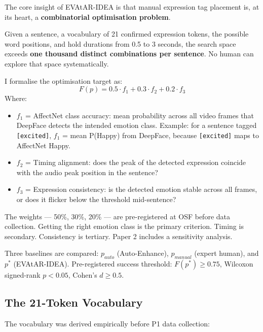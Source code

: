 \documentclass[12pt,a4paper]{article}
\begin{document}
\begin{speechbox}
The core insight of EVAtAR-IDEA is that manual expression tag placement is, at its heart,
a \textbf{combinatorial optimisation problem}.

Given a sentence, a vocabulary of 21 confirmed expression tokens, the possible word positions,
and hold durations from 0.5 to 3 seconds, the search space exceeds \textbf{one thousand distinct
combinations per sentence}. No human can explore that space systematically.

I formalise the optimisation target as:
\[
F(p) = 0.5 \cdot f_1 + 0.3 \cdot f_2 + 0.2 \cdot f_3
\]
Where:
\begin{itemize}[leftmargin=2em,itemsep=2pt]
  \item $f_1$ = AffectNet class accuracy: mean probability across all video frames that DeepFace
    detects the intended emotion class. Example: for a sentence tagged \texttt{[excited]},
    $f_1$ = mean P(Happy) from DeepFace, because \texttt{[excited]} maps to AffectNet Happy.
  \item $f_2$ = Timing alignment: does the peak of the detected expression coincide with the
    audio peak position in the sentence?
  \item $f_3$ = Expression consistency: is the detected emotion stable across all frames,
    or does it flicker below the threshold mid-sentence?
\end{itemize}

The weights --- 50\%, 30\%, 20\% --- are pre-registered at OSF before data collection.
Getting the right emotion class is the primary criterion. Timing is secondary.
Consistency is tertiary. Paper 2 includes a sensitivity analysis.

Three baselines are compared: \textbf{$p_{auto}$} (Auto-Enhance), \textbf{$p_{manual}$}
(expert human), and \textbf{$p^*$} (EVAtAR-IDEA). Pre-registered success threshold:
$F(p^*) \geq 0.75$, Wilcoxon signed-rank $p < 0.05$, Cohen's $d \geq 0.5$.
\end{speechbox}

\subsection{The 21-Token Vocabulary}

The vocabulary was derived empirically before P1 data collection:
\end{document}
